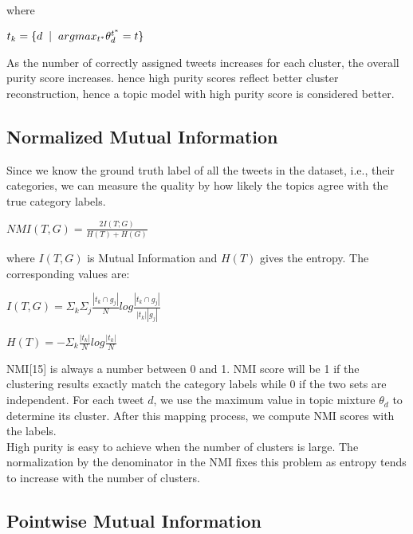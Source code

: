 \documentclass[10pt,a5paper,twoside]{article}
\begin{document}
where

\begin{center}
$ t_k = \lbrace  d \hspace{2 mm} |  \hspace{2 mm} argmax_{t^*} \theta^{t^{*}}_d = t \rbrace $
\end{center}

As the number of correctly assigned tweets increases for each cluster, the overall purity score increases. hence high purity scores reflect better cluster reconstruction, hence a topic model with high purity score is considered better.
\\

\subsection{Normalized Mutual Information}
Since we know the ground truth label of all the tweets in the dataset, i.e., their categories, we can measure the quality by how likely the topics agree with the true category labels. 
\begin{center}
$NMI(T,G) = \frac{2 I(T;G)}{H(T) + H(G)} $
\end{center}
where $I(T,G)$ is Mutual Information and $H(T)$ gives the entropy. The 
corresponding values are:

\begin{center}
$ I(T,G) = \Sigma_{k} \Sigma_{j} \frac{|t_{k} \cap g_{j}|}{N} log \frac{|t_{k} \cap g_{j}|}{|t_{k}| |g_{j}|} $
\end{center}

\begin{center}
$ H(T) = - \Sigma_k \frac{|t_k|}{N} log \frac{|t_k|}{N} $
\end{center}

NMI[15] is always a number between 0 and 1. NMI score will be 1 if the clustering results exactly match the category labels while 0 if the two sets are independent. For each tweet $d$, we use the maximum value in topic mixture $ \theta_{d} $ to determine its cluster. After this mapping process, we compute NMI scores with the labels.
\\
High purity is easy to achieve when the number of clusters is large. The normalization by the denominator in the NMI fixes this problem as entropy tends to increase with the number of clusters.

\subsection{Pointwise Mutual Information}
\end{document}

